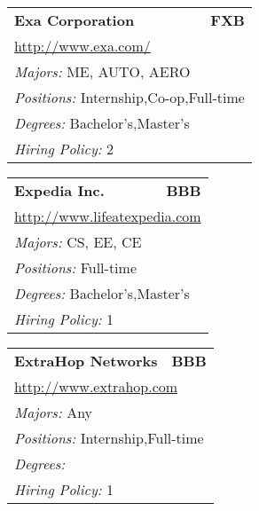 \documentclass[twoside]{article}
\begin{document}
\begin{center}
\begin{multicols}{3}
\begin{FlushLeft}
\begin{minipage}{.9\columnwidth}
\end{minipage}
 
\begin{minipage}{.9\columnwidth}\begin{tabularx}{.95\columnwidth}{Xr}
                 {\Large\bf Exa Corporation} & {\Large\bf FXB}\\
    \multicolumn{2}{p{.95\columnwidth}}{\url{http://www.exa.com/}}\\
    \multicolumn{2}{p{.95\columnwidth}}{\emph{Majors:} ME, AUTO, AERO}\\
    \multicolumn{2}{p{.95\columnwidth}}{\emph{Positions:} Internship,Co-op,Full-time}\\
    \multicolumn{2}{p{.95\columnwidth}}{\emph{Degrees:} Bachelor's,Master's}\\
    \multicolumn{2}{p{.95\columnwidth}}{\emph{Hiring Policy:} 2}\\
    \end{tabularx}
    
\end{minipage}
 
\begin{minipage}{.9\columnwidth}\begin{tabularx}{.95\columnwidth}{Xr}
                 {\Large\bf Expedia Inc.} & {\Large\bf BBB}\\
    \multicolumn{2}{p{.95\columnwidth}}{\url{http://www.lifeatexpedia.com}}\\
    \multicolumn{2}{p{.95\columnwidth}}{\emph{Majors:} CS, EE, CE}\\
    \multicolumn{2}{p{.95\columnwidth}}{\emph{Positions:} Full-time}\\
    \multicolumn{2}{p{.95\columnwidth}}{\emph{Degrees:} Bachelor's,Master's}\\
    \multicolumn{2}{p{.95\columnwidth}}{\emph{Hiring Policy:} 1}\\
    \end{tabularx}
    
\end{minipage}
 
\begin{minipage}{.9\columnwidth}\begin{tabularx}{.95\columnwidth}{Xr}
                 {\Large\bf ExtraHop Networks} & {\Large\bf BBB}\\
    \multicolumn{2}{p{.95\columnwidth}}{\url{http://www.extrahop.com}}\\
    \multicolumn{2}{p{.95\columnwidth}}{\emph{Majors:} Any}\\
    \multicolumn{2}{p{.95\columnwidth}}{\emph{Positions:} Internship,Full-time}\\
    \multicolumn{2}{p{.95\columnwidth}}{\emph{Degrees:} }\\
    \multicolumn{2}{p{.95\columnwidth}}{\emph{Hiring Policy:} 1}\\
    \end{tabularx}
    

\end{minipage}
\end{FlushLeft}
\end{multicols}
\end{center}
\end{document}
